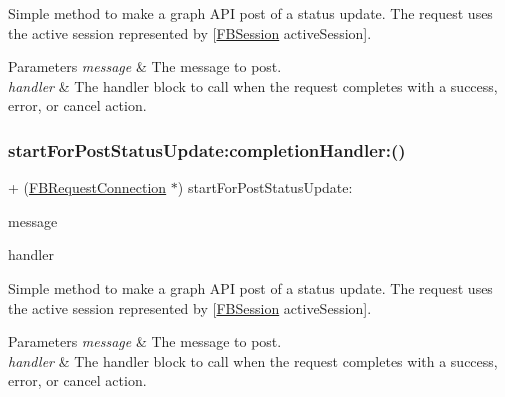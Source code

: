 Simple method to make a graph A\+PI post of a status update. The request uses the active session represented by {\ttfamily \mbox{[}\hyperlink{interfaceFBSession}{F\+B\+Session} active\+Session\mbox{]}}.


\begin{DoxyParams}{Parameters}
{\em message} & The message to post. \\
\hline
{\em handler} & The handler block to call when the request completes with a success, error, or cancel action. \\
\hline
\end{DoxyParams}
\mbox{\label{interfaceFBRequestConnection_a0dee12879e90db0c29e15916375c73b0}} 
\subsubsection{\texorpdfstring{start\+For\+Post\+Status\+Update\+:completion\+Handler\+:()}{startForPostStatusUpdate:completionHandler:()}\hspace{0.1cm}{\footnotesize\ttfamily [5/5]}}
{\footnotesize\ttfamily + (\hyperlink{interfaceFBRequestConnection}{F\+B\+Request\+Connection} $\ast$) start\+For\+Post\+Status\+Update\+: \begin{DoxyParamCaption}\item[{(N\+S\+String $\ast$)}]{message }\item[{completionHandler:(F\+B\+Request\+Handler)}]{handler }\end{DoxyParamCaption}}

Simple method to make a graph A\+PI post of a status update. The request uses the active session represented by {\ttfamily \mbox{[}\hyperlink{interfaceFBSession}{F\+B\+Session} active\+Session\mbox{]}}.


\begin{DoxyParams}{Parameters}
{\em message} & The message to post. \\
\hline
{\em handler} & The handler block to call when the request completes with a success, error, or cancel action. \\
\hline
\end{DoxyParams}
\mbox{\label{interfaceFBRequestConnection_a98c2c8abc0efadda28f1c21ec0878a05}} 
